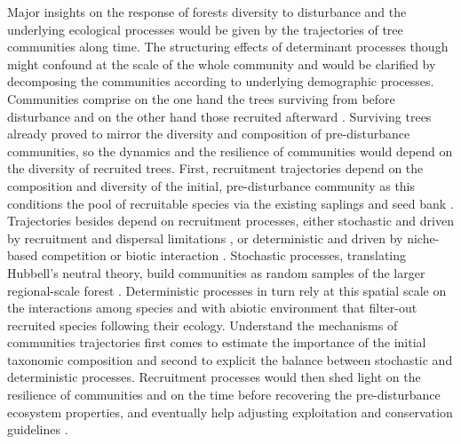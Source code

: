 \documentclass[fleqn,10pt]{ArtEcoFoG} %
\begin{document}
Major insights on the response of forests diversity to disturbance and
the underlying ecological processes would be given by the trajectories
of tree communities along time. The structuring effects of determinant
processes though might confound at the scale of the whole community
\citep{Chave2004} and would be clarified by decomposing the communities
according to underlying demographic processes. Communities comprise on
the one hand the trees surviving from before disturbance and on the
other hand those recruited afterward \citep{Herault2018}. Surviving
trees already proved to mirror the diversity and composition of
pre-disturbance communities, so the dynamics and the resilience of
communities would depend on the diversity of recruited trees. First,
recruitment trajectories depend on the composition and diversity of the
initial, pre-disturbance community as this conditions the pool of
recruitable species via the existing saplings and seed bank
\citep{Herault2018}. Trajectories besides depend on recruitment
processes, either stochastic and driven by recruitment and dispersal
limitations \citep{Hurtt1995, Hubbell2001}, or deterministic and driven
by niche-based competition or biotic interaction \citep{Adler2007}.
Stochastic processes, translating Hubbell's neutral theory, build
communities as random samples of the larger regional-scale forest
\citep{Hubbell2001, Chave2004}. Deterministic processes in turn rely at
this spatial scale on the interactions among species and with abiotic
environment that filter-out recruited species following their ecology.
Understand the mechanisms of communities trajectories first comes to
estimate the importance of the initial taxonomic composition and second
to explicit the balance between stochastic and deterministic processes.
Recruitment processes would then shed light on the resilience of
communities and on the time before recovering the pre-disturbance
ecosystem properties, and eventually help adjusting exploitation and
conservation guidelines \citep{Diaz2005, Gardner2007, Schwartz2017}.
\end{document}
